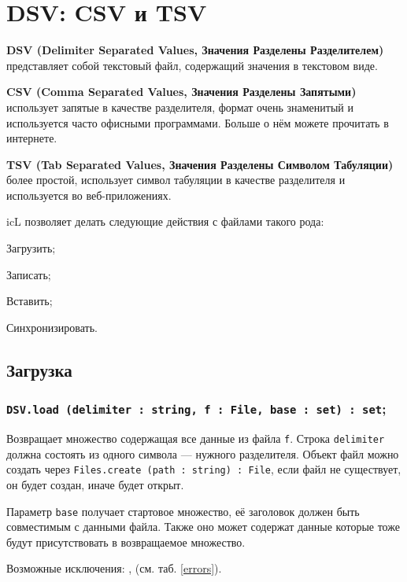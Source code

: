 \section{DSV: CSV и TSV}

{\bf DSV (Delimiter Separated Values, Значения Разделены Разделителем)} представляет собой текстовый файл, содержащий значения в текстовом виде.

{\bf CSV (Comma Separated Values, Значения Разделены Запятыми)} использует запятые в качестве разделителя, формат очень знаменитый и используется часто офисными программами. Больше о нём можете прочитать в интернете.

{\bf TSV (Tab Separated Values, Значения Разделены Символом Табуляции)} более простой, использует символ табуляции в качестве разделителя и используется во веб-приложениях.

icL позволяет делать следующие действия с файлами такого рода:
\begin{icItems}
	\item Загрузить;
	\item Записать;
	\item Вставить;
	\item Синхронизировать.
\end{icItems}

\subsection{Загрузка}

\subsubsection{\texttt{DSV.load (delimiter : string, f : File, base : set) : set};}

Возвращает множество содержащая все данные из файла \texttt{f}. Строка \texttt{delimiter} должна состоять из одного символа — нужного разделителя. Объект файл можно создать через \texttt{Files.create (path : string) : File}, если файл не существует, он будет создан, иначе будет открыт.

Параметр \texttt{base} получает стартовое множество, её заголовок должен быть совместимым с данными файла. Также оно может содержат данные которые тоже будут присутствовать в возвращаемое множество. 

Возможные исключения: ,  (см. таб. \ref{errors}).

